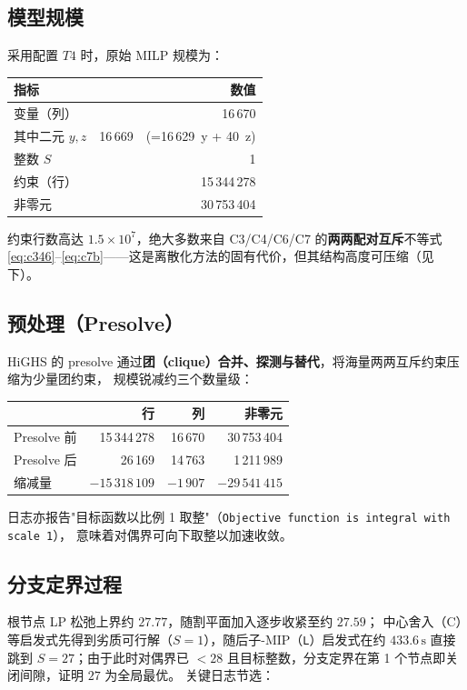 \documentclass[11pt]{article}
\newcommand{\unit}[1]{\,\mathrm{#1}}
\begin{document}
\subsection{模型规模}
采用配置 $T4$ 时，原始 MILP 规模为：
\begin{center}
\begin{tabular}{lr}
\toprule
指标 & 数值 \\
\midrule
变量（列） & 16\,670 \\
\quad 其中二元 $y,z$ & 16\,669\ \ (=16\,629\ y + 40\ z) \\
\quad 整数 $S$ & 1 \\
约束（行） & 15\,344\,278 \\
非零元 & 30\,753\,404 \\
\bottomrule
\end{tabular}
\end{center}
约束行数高达 $1.5\times10^{7}$，绝大多数来自 C3/C4/C6/C7 的\textbf{两两配对互斥}不等式
\eqref{eq:c346}--\eqref{eq:c7b}——这是离散化方法的固有代价，但其结构高度可压缩（见下）。

\subsection{预处理（Presolve）}
HiGHS 的 presolve 通过\textbf{团（clique）合并、探测与替代}，将海量两两互斥约束压缩为少量团约束，
规模锐减约三个数量级：
\begin{center}
\begin{tabular}{lrrr}
\toprule
& 行 & 列 & 非零元 \\
\midrule
Presolve 前 & 15\,344\,278 & 16\,670 & 30\,753\,404 \\
Presolve 后 & 26\,169 & 14\,763 & 1\,211\,989 \\
\midrule
缩减量 & $-15\,318\,109$ & $-1\,907$ & $-29\,541\,415$ \\
\bottomrule
\end{tabular}
\end{center}
日志亦报告"目标函数以比例 1 取整"（\texttt{Objective function is integral with scale 1}），
意味着对偶界可向下取整以加速收敛。

\subsection{分支定界过程}
根节点 LP 松弛上界约 $27.77$，随割平面加入逐步收紧至约 $27.59$；
中心舍入（C）等启发式先得到劣质可行解（$S=1$），随后子-MIP（\texttt{L}）启发式在约 $433.6\unit{s}$
直接跳到 $S=27$；由于此时对偶界已 $<28$ 且目标整数，分支定界在第 1 个节点即关闭间隙，证明 $27$ 为全局最优。
关键日志节选：
\end{document}

